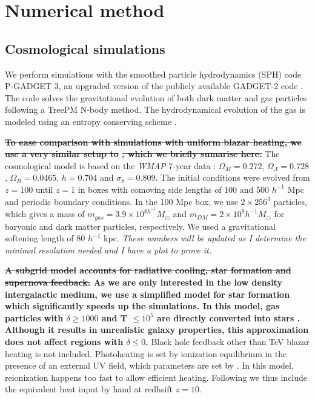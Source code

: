 \documentclass[twocolumns]{emulateapj}
\newcommand\ALc[1]{{\color{red} \bf #1}} %
\begin{document}
 


\section{Numerical method}
\subsection{Cosmological simulations}
We perform simulations with the smoothed particle hydrodynamics (SPH)  code \textsc{P-GADGET 3}, an upgraded version of the publicly available \textsc{GADGET-2} code \citep{2005MNRAS.364.1105S}. The code solves the gravitational evolution of both dark matter and gas particles following a TreePM N-body method. The hydrodynamical evolution of the gas is modeled using an entropy conserving scheme \citep{2002MNRAS.333..649S}.

\ALc{\sout{To ease comparison with simulations with uniform blazar heating, we use a very similar setup to }\citet{2012MNRAS.423..149P}\sout{, which we briefly sumarise here. }}
The cosmological model is based on the \textit{WMAP} 7-year data \citep{2011ApJS..192...18K}: $\Omega_M=0.272$, $\Omega_{\Lambda}=0.728$, $\Omega_{B}= 0.0465$, $h=0.704$ and $\sigma_8=0.809$. The initial conditions were evolved from $z=100$ until $z=1$ in boxes with  comoving side lengths of 100 and 500 $h^{-1}$ Mpc and periodic boundary conditions. In the 100 Mpc box, we use $2\times 256^3$ particles, which gives a mass of $m_{gas}=3.9\times10^{8 h^{-1} }M_{\odot}$ and $m_{DM}=2\times 10^{9} h^{-1} M_{\odot}$ for baryonic and dark matter particles, respectively. We used  a gravitational softening length of 80 $h^{-1}$ kpc. \textit{These numbers will be updated as I determine the minimal resolution needed and I have a plot to prove it.}

\ALc{\sout{A subgrid model} \citep{2003MNRAS.339..289S} \sout{accounts for radiative cooling, star formation and supernova feedback.} As we are only interested in the low density intergalactic medium, we use a simplified model for star formation which significantly speeds up the simulations. In this model, gas particles with $\delta\geq 1000$ and T $\leq 10^5$ are directly converted into stars \citep{2004MNRAS.354..684V}. Although it results in unrealistic galaxy properties, this approximation does not affect regions with $\delta \leq 0$.}  Black hole feedback other than TeV blazar heating is not included. Photoheating is set by ionization equilibrium in the presence of an external UV field, which parameters are set by \citet{2009ApJ...703.1416F}. In this model, reionization happens too fast to allow efficient heating. Following \citet{2012MNRAS.423..149P} we thus include the equivalent heat input by hand at redhsift $z=10$.
\end{document}
